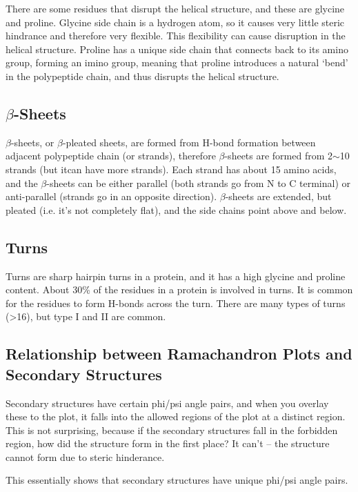 There are some residues that disrupt the helical structure, and these are glycine and proline.
Glycine side chain is a hydrogen atom, so it causes very little steric hindrance and therefore very flexible.
This flexibility can cause disruption in the helical structure.
Proline has a unique side chain that connects back to its amino group, forming an imino group, meaning that proline introduces a natural `bend' in the polypeptide chain, and thus disrupts the helical structure.

\subsection{$\beta$-Sheets}

$\beta$-sheets, or $\beta$-pleated sheets, are formed from H-bond formation between adjacent polypeptide chain (or strands), therefore $\beta$-sheets are formed from 2$\sim$10 strands (but itcan have more strands).
Each strand has about 15 amino acids, and the $\beta$-sheets can be either parallel (both strands go from N to C terminal) or anti-parallel (strands go in an opposite direction).
$\beta$-sheets are extended, but pleated (i.e. it's not completely flat), and the side chains point above and below.

\subsection{Turns}

Turns are sharp hairpin turns in a protein, and it has a high glycine and proline content.
About 30\% of the residues in a protein is involved in turns.
It is common for the residues to form H-bonds across the turn.
There are many types of turns (\textgreater16), but type I and II are common.

\subsection{Relationship between Ramachandron Plots and Secondary Structures}

Secondary structures have certain phi/psi angle pairs, and when you overlay these to the plot, it falls into the allowed regions of the plot at a distinct region.
This is not surprising, because if the secondary structures fall in the forbidden region, how did the structure form in the first place?
It can't -- the structure cannot form due to steric hinderance.

This essentially shows that secondary structures have unique phi/psi angle pairs.

